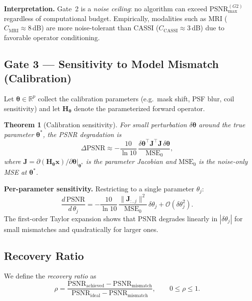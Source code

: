 \documentclass[11pt]{article}
\newtheorem{theorem}{Theorem}
\begin{document}
\noindent\textbf{Interpretation.}
Gate~2 is a \emph{noise ceiling}: no algorithm can exceed
$\mathrm{PSNR}_{\max}^{(G2)}$ regardless of computational budget.
Empirically, modalities such as MRI ($C_{\mathrm{MRI}}\approx 8$\,dB) are more
noise-tolerant than CASSI ($C_{\mathrm{CASSI}}\approx 3$\,dB) due to
favorable operator conditioning.

\subsection{Gate 3 --- Sensitivity to Model Mismatch (Calibration)}

Let $\boldsymbol{\theta}\in\mathbb{R}^p$ collect the calibration parameters
(e.g.\ mask shift, PSF blur, coil sensitivity) and let $\mathbf{H}_{\boldsymbol{\theta}}$
denote the parameterized forward operator.

\begin{theorem}[Calibration sensitivity]
For small perturbation $\delta\boldsymbol{\theta}$ around the true parameter
$\boldsymbol{\theta}^*$, the PSNR degradation is
\begin{equation}
  \Delta\mathrm{PSNR}
  \approx -\frac{10}{\ln 10}\,
  \frac{\delta\boldsymbol{\theta}^\top
        \mathbf{J}^\top \mathbf{J}\,
        \delta\boldsymbol{\theta}}
       {\mathrm{MSE}_0},
  \label{eq:gate3}
\end{equation}
where $\mathbf{J} = \partial(\mathbf{H}_{\boldsymbol{\theta}}\mathbf{x})/
\partial\boldsymbol{\theta}\big|_{\boldsymbol{\theta}^*}$ is the parameter
Jacobian and $\mathrm{MSE}_0$ is the noise-only MSE at
$\boldsymbol{\theta}^*$.
\end{theorem}

\noindent\textbf{Per-parameter sensitivity.}
Restricting to a single parameter $\theta_j$:
\begin{equation}
  \frac{d\,\mathrm{PSNR}}{d\,\theta_j}
  = -\frac{10}{\ln 10}\,
    \frac{\|\mathbf{J}_{:,j}\|^2}{\mathrm{MSE}_0}\,\delta\theta_j
  + \mathcal{O}(\delta\theta_j^2).
\end{equation}
The first-order Taylor expansion shows that PSNR degrades linearly in
$|\delta\theta_j|$ for small mismatches and quadratically for larger ones.

\subsection{Recovery Ratio}

We define the \emph{recovery ratio} as
\begin{equation}
  \rho
  = \frac{\mathrm{PSNR}_{\mathrm{achieved}} - \mathrm{PSNR}_{\mathrm{mismatch}}}
         {\mathrm{PSNR}_{\mathrm{ideal}} - \mathrm{PSNR}_{\mathrm{mismatch}}},
  \qquad 0 \leq \rho \leq 1.
  \label{eq:rho}
\end{equation}
\end{document}
